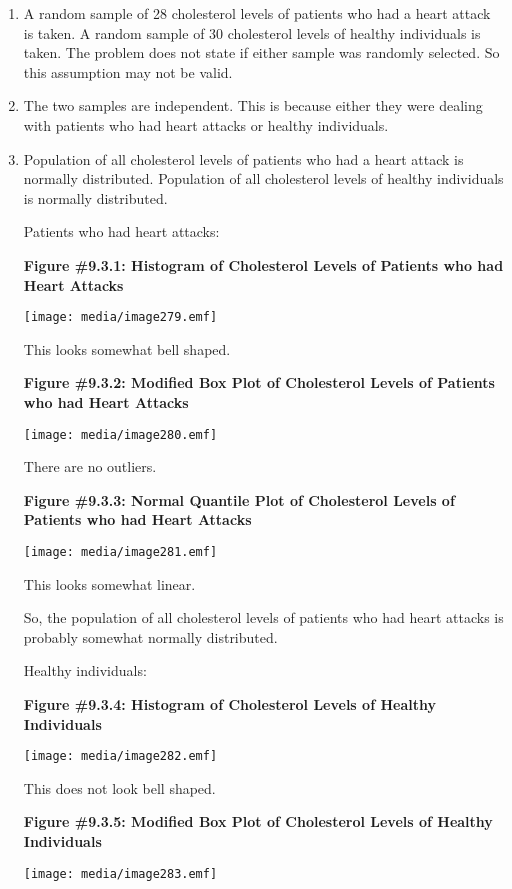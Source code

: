 \documentclass[]{book}
\begin{document}
\begin{enumerate}
\def\labelenumi{\alph{enumi}.}
\item
  A random sample of 28 cholesterol levels of patients who had a heart attack is taken. A random sample of 30 cholesterol levels of healthy individuals is taken. The problem does not state if either sample was randomly selected. So this assumption may not be valid.
\item
  The two samples are independent. This is because either they were dealing with patients who had heart attacks or healthy individuals.
\item
  Population of all cholesterol levels of patients who had a heart attack is normally distributed. Population of all cholesterol levels of healthy individuals is normally distributed.

  Patients who had heart attacks:

  \textbf{Figure \#9.3.1: Histogram of Cholesterol Levels of Patients who
  had Heart Attacks}

  \texttt{[image: media/image279.emf]}

  This looks somewhat bell shaped.

  \textbf{Figure \#9.3.2: Modified Box Plot of Cholesterol Levels of
  Patients who had Heart Attacks}

  \texttt{[image: media/image280.emf]}

  There are no outliers.

  \textbf{Figure \#9.3.3: Normal Quantile Plot of Cholesterol Levels of
  Patients who had Heart Attacks}

  \texttt{[image: media/image281.emf]}

  This looks somewhat linear.

  So, the population of all cholesterol levels of patients who had
  heart attacks is probably somewhat normally distributed.

  Healthy individuals:

  \textbf{Figure \#9.3.4: Histogram of Cholesterol Levels of Healthy
  Individuals}

  \texttt{[image: media/image282.emf]}

  This does not look bell shaped.

  \textbf{Figure \#9.3.5: Modified Box Plot of Cholesterol Levels of Healthy
  Individuals}

  \texttt{[image: media/image283.emf]}


\end{enumerate}
\end{document}
